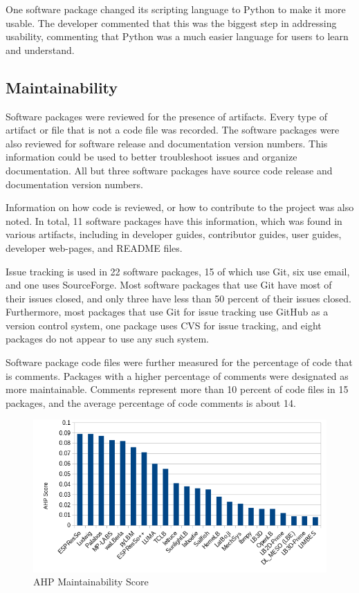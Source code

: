 \documentclass[12pt, notitlepage]{article}
\begin{document}
One software package changed its scripting language to Python to make it more usable. The developer commented that this was the biggest step in addressing usability, commenting that Python was a much easier language for users to learn and understand. 

\subsection{Maintainability}

Software packages were reviewed for the presence of artifacts. Every type of artifact or file that is not a code file was recorded. The software packages were also reviewed for software release and documentation version numbers. This information could be used to better troubleshoot issues and organize documentation. All but three software packages have source code release and documentation version numbers. 

Information on how code is reviewed, or how to contribute to the project was also noted. In total, 11 software packages have this information, which was found in various artifacts, including in developer guides, contributor guides, user guides, developer web-pages, and README files. 

Issue tracking is used in 22 software packages, 15 of which use Git, six use email, and one uses SourceForge. Most software packages that use Git have most of their issues closed, and only three have less than 50 percent of their issues closed. Furthermore, most packages that use Git for issue tracking use GitHub as a version control system, one package uses CVS for issue tracking, and eight packages do not appear to use any such system.

Software package code files were further measured for the percentage of code that is comments. Packages with a higher percentage of comments were designated as more maintainable. Comments represent more than 10 percent of code files in 15 packages, and the average percentage of code comments is about 14.

\begin{figure}[h!]
	\begin{center}
		\includegraphics[width=1.0\textwidth]{maintainability_chart}
		\caption{AHP Maintainability Score}
		\label{Fig_Maintainability}
	\end{center}
\end{figure}
\end{document}
